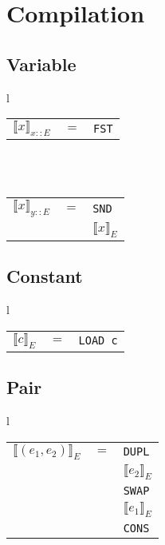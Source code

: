 \documentclass[12pt]{article}
\begin{document}
\thispagestyle{empty}

\section*{Compilation}

\subsection*{Variable}

\begin{tabular}{l}

\begin{tabular}{ccl}
    $\llbracket x \rrbracket_{x::E}$ & $=$ & \texttt{FST}\\
\end{tabular}\\
\\
\begin{tabular}{ccl}
    $\llbracket x \rrbracket_{y::E}$ & $=$ & \texttt{SND}\\
    & & $\llbracket x \rrbracket_{E}$
\end{tabular}

\end{tabular}

\subsection*{Constant}

\begin{tabular}{l}

\begin{tabular}{ccl}
    $\llbracket c \rrbracket_{E}$ & $=$ & \texttt{LOAD c}\\
\end{tabular}
        
\end{tabular}
    
\subsection*{Pair}

\begin{tabular}{l}

\begin{tabular}{ccl}
    $\llbracket (e_1, e_2) \rrbracket_{E}$ & $=$ & \texttt{DUPL}\\
    & & $\llbracket e_2 \rrbracket_{E}$\\
    & & \texttt{SWAP}\\
    & & $\llbracket e_1 \rrbracket_{E}$\\
    & & \texttt{CONS}\\
\end{tabular}
            
\end{tabular}
    
\end{document}

